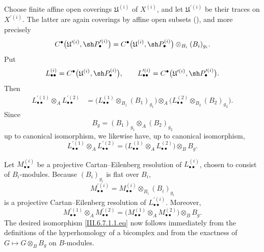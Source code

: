 \begin{env}[6.7.1]

Choose finite affine open coverings $\mathfrak U^{(i)}$ of
$X^{(i)}$, and let $\mathfrak U^{\prime(i)}$ be their traces on
$X^{\prime(i)}$.  The latter are again coverings by affine open
subsets (), and more precisely
\[
  C^\bullet
  \bigl(
    \mathfrak U^{\prime(i)},\sh P_\bullet^{\prime(i)}
  \bigr)
  =
  C^\bullet
  \bigl(
    \mathfrak U^{(i)},\sh P_\bullet^{(i)}
  \bigr)
  \otimes_{B_i}(B_i)_{g_i}.
\]
Put
\[
  L_{\bullet\bullet}^{(i)}
  =
  C^\bullet
  \bigl(
    \mathfrak U^{(i)},\sh P_\bullet^{(i)}
  \bigr),
  \qquad
  L_{\bullet\bullet}^{\prime(i)}
  =
  C^\bullet
  \bigl(
    \mathfrak U^{\prime(i)},\sh P_\bullet^{\prime(i)}
  \bigr).
\]
Then
\[
\begin{split}
  L_{\bullet\bullet}^{\prime(1)}
  \otimes_A L_{\bullet\bullet}^{\prime(2)}
  &=
  \bigl(
    L_{\bullet\bullet}^{(1)}
    \otimes_{B_1}(B_1)_{g_1}
  \bigr)
  \otimes_A
  \bigl(
    L_{\bullet\bullet}^{(2)}
    \otimes_{B_2}(B_2)_{g_2}
  \bigr).
\end{split}
\]
Since
\[
  B_g=(B_1)_{g_1}\otimes_A(B_2)_{g_2}
\]
up to canonical isomorphism, we likewise have, up to canonical
isomorphism,
\[
  L_{\bullet\bullet}^{\prime(1)}
  \otimes_A L_{\bullet\bullet}^{\prime(2)}
  =
  \bigl(
    L_{\bullet\bullet}^{(1)}
    \otimes_A L_{\bullet\bullet}^{(2)}
  \bigr)
  \otimes_BB_g.
\]

Let $M_{\bullet\bullet}^{(i)}$ be a projective
Cartan--Eilenberg resolution of $L_{\bullet\bullet}^{(i)}$,
chosen to consist of $B_i$-modules.  Because $(B_i)_{g_i}$ is
flat over $B_i$,
\[
  M_{\bullet\bullet}^{\prime(i)}
  =
  M_{\bullet\bullet}^{(i)}
  \otimes_{B_i}(B_i)_{g_i}
\]
is a projective Cartan--Eilenberg resolution of
$L_{\bullet\bullet}^{\prime(i)}$.  Moreover,
\[
  M_{\bullet\bullet}^{\prime(1)}
  \otimes_A M_{\bullet\bullet}^{\prime(2)}
  =
  \bigl(
    M_{\bullet\bullet}^{(1)}
    \otimes_A M_{\bullet\bullet}^{(2)}
  \bigr)
  \otimes_BB_g.
\]
The desired isomorphism \eqref{III.6.7.1.1.eq} now follows
immediately from the definitions of the hyperhomology of a
bicomplex and from the exactness of
$G\longmapsto G\otimes_BB_g$ on $B$-modules.
\end{env}

